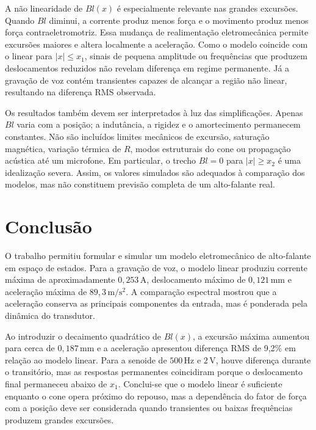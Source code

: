 \documentclass[11pt,letterpaper]{article}
\begin{document}
A não linearidade de $Bl(x)$ é especialmente relevante nas grandes excursões. Quando $Bl$ diminui,
a corrente produz menos força e o movimento produz menos força contraeletromotriz. Essa mudança
de realimentação eletromecânica permite excursões maiores e altera localmente a aceleração. Como o
modelo coincide com o linear para $|x|\leq x_1$, sinais de pequena amplitude ou frequências que
produzem deslocamentos reduzidos não revelam diferença em regime permanente. Já a gravação de voz
contém transientes capazes de alcançar a região não linear, resultando na diferença RMS observada.

Os resultados também devem ser interpretados à luz das simplificações. Apenas $Bl$ varia com a
posição; a indutância, a rigidez e o amortecimento permanecem constantes. Não são incluídos limites
mecânicos de excursão, saturação magnética, variação térmica de $R$, modos estruturais do cone ou
propagação acústica até um microfone. Em particular, o trecho $Bl=0$ para $|x|\geq x_2$ é uma
idealização severa. Assim, os valores simulados são adequados à comparação dos modelos, mas não
constituem previsão completa de um alto-falante real.

\section{Conclusão}

O trabalho permitiu formular e simular um modelo eletromecânico de alto-falante em espaço de
estados. Para a gravação de voz, o modelo linear produziu corrente máxima de aproximadamente
$0{,}253\,\mathrm{A}$, deslocamento máximo de $0{,}121\,\mathrm{mm}$ e aceleração máxima de
$89{,}3\,\mathrm{m/s^2}$. A comparação espectral mostrou que a aceleração conserva as principais
componentes da entrada, mas é ponderada pela dinâmica do transdutor.

Ao introduzir o decaimento quadrático de $Bl(x)$, a excursão máxima aumentou para cerca de
$0{,}187\,\mathrm{mm}$ e a aceleração apresentou diferença RMS de 9,2\% em relação ao modelo
linear. Para a senoide de $500\,\mathrm{Hz}$ e $2\,\mathrm{V}$, houve diferença durante o
transitório, mas as respostas permanentes coincidiram porque o deslocamento final permaneceu abaixo
de $x_1$. Conclui-se que o modelo linear é suficiente enquanto o cone opera próximo do repouso,
mas a dependência do fator de força com a posição deve ser considerada quando transientes ou
baixas frequências produzem grandes excursões.
\end{document}
